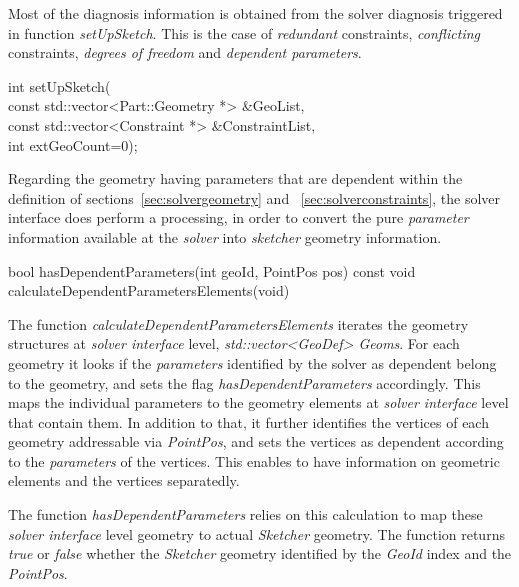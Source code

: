 \documentclass[12pt,twoside,a4paper]{book}
\begin{document}
    Most of the diagnosis information is obtained from the solver diagnosis triggered in function \emph{setUpSketch}. This is the case of \emph{redundant} constraints, \emph{conflicting} constraints, \emph{degrees of freedom} and \emph{dependent parameters}.

    \begin{codequote}
        int setUpSketch(\\
        \-\hspace{0.75cm}const std::vector\textless{}Part::Geometry *\textgreater{} \&GeoList,\\
        \-\hspace{0.75cm}const std::vector\textless{}Constraint *\textgreater{} \&ConstraintList,\\
        \-\hspace{0.75cm}int extGeoCount=0);
    \end{codequote}


    Regarding the geometry having parameters that are dependent within the definition of sections~\ref{sec:solvergeometry} and ~\ref{sec:solverconstraints}, the solver interface does perform a processing, in order to convert the pure \emph{parameter} information available at the \emph{solver} into \emph{sketcher} geometry information.

    \begin{codequote}
        bool hasDependentParameters(int geoId, PointPos pos) const
        void calculateDependentParametersElements(void)
    \end{codequote}

     The function \emph{calculateDependentParametersElements} iterates the geometry structures at \emph{solver interface} level, \emph{std::vector\textless{}GeoDef\textgreater{} Geoms}. For each geometry it looks if the \emph{parameters} identified by the solver as dependent belong to the geometry, and sets the flag \emph{hasDependentParameters} accordingly. This maps the individual parameters to the geometry elements at \emph{solver interface} level that contain them. In addition to that, it further identifies the vertices of each geometry addressable via \emph{PointPos}, and sets the vertices as dependent according to the \emph{parameters} of the vertices. This enables to have information on geometric elements and the vertices separatedly.

     The function \emph{hasDependentParameters} relies on this calculation to map these \emph{solver interface} level geometry to actual \emph{Sketcher} geometry. The function returns \emph{true} or \emph{false} whether the \emph{Sketcher} geometry identified by the \emph{GeoId} index and the \emph{PointPos}.
\end{document}
